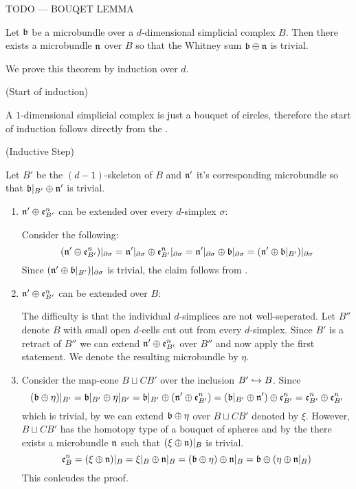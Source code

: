 TODO --- BOUQET LEMMA

\begin{mytheorem}
    Let $\mathfrak{b}$ be a microbundle over a $d$-dimensional simplicial complex $B$.
    Then there exists a microbundle $\mathfrak{n}$ over $B$ so that the Whitney sum $\mathfrak{b} \oplus \mathfrak{n}$ is trivial.
\end{mytheorem}
\begin{myproof}
We prove this theorem by induction over $d$.

(Start of induction)

A $1$-dimensional simplicial complex is just a bouquet of circles, therefore
the start of induction follows directly from the .   

(Inductive Step)

Let $B'$ be the $(d - 1)$-skeleton of $B$ and $\mathfrak{n}'$ it's corresponding microbundle
so that $\mathfrak{b}\vert_{B'} \oplus \mathfrak{n}'$ is trivial.

\begin{enumerate}
    \item $\mathfrak{n}' \oplus \mathfrak{e}^n_{B'}$ can be extended over every $d$-simplex $\sigma$:

    Consider the following:
    \[
        (\mathfrak{n}' \oplus \mathfrak{e}^n_{B'})\vert_{\partial\sigma}
        = \mathfrak{n}'\vert_{\partial\sigma} \oplus \mathfrak{e}^n_{B'}\vert_{\partial\sigma}
        = \mathfrak{n}'\vert_{\partial\sigma} \oplus \mathfrak{b}\vert_{\partial\sigma}
        = (\mathfrak{n}' \oplus \mathfrak{b}\vert_{B'})\vert_{\partial\sigma}
    \]
    Since $(\mathfrak{n}' \oplus \mathfrak{b}\vert_{B'})\vert_{\partial\sigma}$ is trivial, the claim follows from .

    \item $\mathfrak{n}' \oplus \mathfrak{e}^n_{B'}$ can be extended over $B$:

    The difficulty is that the individual $d$-simplices are not well-seperated.
    Let $B''$ denote $B$ with small open $d$-cells cut out from every $d$-simplex.
    Since $B'$ is a retract of $B''$ we can extend $\mathfrak{n}' \oplus \mathfrak{e}^n_{B'}$ over $B''$ and now apply the first statement.
    We denote the resulting microbundle by $\eta$.

    \item
    Consider the map-cone $B \sqcup CB'$ over the inclusion $B' \hookrightarrow{} B$.
    Since
    \[
        (\mathfrak{b} \oplus \eta)\vert_{B'}
        = \mathfrak{b}\vert_{B'} \oplus \eta\vert_{B'}
        = \mathfrak{b}\vert_{B'} \oplus (\mathfrak{n}' \oplus \mathfrak{e}^n_{B'})
        = (\mathfrak{b}\vert_{B'} \oplus \mathfrak{n}') \oplus \mathfrak{e}^n_{B'}
        = \mathfrak{e}^n_{B'} \oplus \mathfrak{e}^n_{B'}
    \]
    which is trivial, by  we can extend $\mathfrak{b} \oplus \eta$ over $B \sqcup CB'$ denoted by $\xi$.
    However, $B \sqcup CB'$ has the homotopy type of a bouquet of spheres and by the  there exists a microbundle $\mathfrak{n}$ such that $(\xi \oplus \mathfrak{n})\vert_{B}$ is trivial.
    \[ 
        \mathfrak{e}^n_{B}
        = (\xi \oplus \mathfrak{n})\vert_{B}
        = \xi\vert_{B} \oplus \mathfrak{n}\vert_{B}
        = (\mathfrak{b} \oplus \eta) \oplus \mathfrak{n}\vert_{B}
        = \mathfrak{b} \oplus (\eta \oplus \mathfrak{n}\vert_{B})
    \]
    This conlcudes the proof.
\end{enumerate}

\end{myproof}
